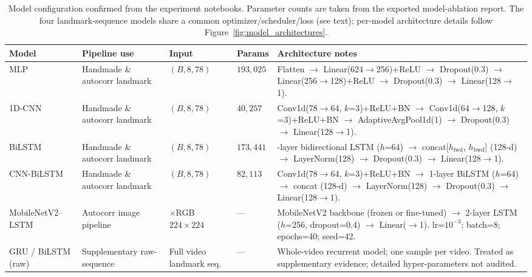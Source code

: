 \begin{table}[htbp]
\centering
\caption{Model configuration confirmed from the experiment notebooks. Parameter
counts are taken from the exported model-ablation report. The four
landmark-sequence models share a common optimizer/scheduler/loss (see text);
per-model architecture details follow Figure~\ref{fig:model_architectures}.}
\label{tab:model-config}
\renewcommand{\arraystretch}{1.18}
\scriptsize
\begin{tabularx}{\textwidth}{
>{\raggedright\arraybackslash}p{}
>{\raggedright\arraybackslash}p{}
>{\raggedright\arraybackslash}p{}
>{\raggedright\arraybackslash}p{}
>{\raggedright\arraybackslash}X}
\toprule
Model & Pipeline use & Input & Params & Architecture notes \\
\midrule
MLP & Handmade \& autocorr landmark & $(B,8,78)$ & $193{,}025$ &
  Flatten $\to$ Linear(624$\to$256)+ReLU $\to$ Dropout(0.3) $\to$
  Linear(256$\to$128)+ReLU $\to$ Dropout(0.3) $\to$ Linear(128$\to$1). \\
\addlinespace
1D-CNN & Handmade \& autocorr landmark & $(B,8,78)$ & $40{,}257$ &
  Conv1d(78$\to$64, $k$=3)+ReLU+BN $\to$ Conv1d(64$\to$128, $k$=3)+ReLU+BN
  $\to$ AdaptiveAvgPool1d(1) $\to$ Dropout(0.3) $\to$ Linear(128$\to$1). \\
\addlinespace
BiLSTM & Handmade \& autocorr landmark & $(B,8,78)$ & $173{,}441$ &
  2-layer bidirectional LSTM ($h$=64) $\to$ concat[$h_\text{fwd}$, $h_\text{bwd}$]
  (128-d) $\to$ LayerNorm(128) $\to$ Dropout(0.3) $\to$ Linear(128$\to$1). \\
\addlinespace
CNN-BiLSTM & Handmade \& autocorr landmark & $(B,8,78)$ & $82{,}113$ &
  Conv1d(78$\to$64, $k$=3)+ReLU+BN $\to$ 1-layer BiLSTM ($h$=64) $\to$
  concat (128-d) $\to$ LayerNorm(128) $\to$ Dropout(0.3) $\to$ Linear(128$\to$1). \\
\addlinespace
MobileNetV2--LSTM & Autocorr image pipeline & 8$\times$RGB $224{\times}224$ & --- &
  MobileNetV2 backbone (frozen or fine-tuned) $\to$ 2-layer LSTM
  ($h$=256, dropout=0.4) $\to$ Linear($\to$1).
  lr=$10^{-3}$; batch=8; epochs=40; seed=42. \\
\addlinespace
GRU / BiLSTM (raw) & Supplementary raw-sequence & Full video landmark seq. & --- &
  Whole-video recurrent model; one sample per video. Treated as supplementary
  evidence; detailed hyper-parameters not audited. \\
\bottomrule
\end{tabularx}
\end{table}

